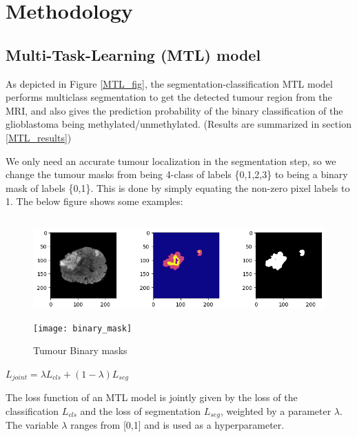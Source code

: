 \chapter{Methodology}
\ifpdf
    \graphicspath{{Chapter3/Chapter3Figs/PNG/}{Chapter3/Chapter3Figs/PDF/}{Chapter3/Chapter3Figs/}}
\else
    \graphicspath{{Chapter3/Chapter3Figs/EPS/}{Chapter3/Chapter3Figs/}}
\fi

\section{Multi-Task-Learning (MTL) model}\label{MTL}
\vspace*{3mm}
As depicted in Figure \ref{MTL_fig}, the segmentation-classification MTL model performs multiclass segmentation to get the detected tumour region from the MRI, and also gives the prediction probability of the binary classification of the glioblastoma being methylated/unmethylated. (Results are summarized in section \ref{MTL_results})
\vspace*{3mm}

We only need an accurate tumour localization in the segmentation step, so we change the tumour masks from being 4-class of labels \{0,1,2,3\} to being a binary mask of labels \{0,1\}. This is done by simply equating the non-zero pixel labels to 1. The below figure shows some examples:
\vspace*{4mm}
\begin{figure}[H]
  \begin{center}
    \leavevmode
    \ifpdf
      \includegraphics[height=1.5in]{Methodology/Chapter3Figs/binary_mask.png}
    \else
      \texttt{[image: binary\_mask]}
    \fi
    \caption{Tumour Binary masks}
    \label{binary_mask}
  \end{center}
\end{figure}

\begin{center}
    $L_{joint} =\displaystyle \lambda L_{cls} + (1-\lambda) L_{seg}$
\end{center}
The loss function of an MTL model is jointly given by the loss of the classification $L_{cls}$ and the loss of segmentation $L_{seg}$, weighted by a parameter $\lambda$. The variable $\lambda$ ranges from [0,1] and is used as a hyperparameter. 
\vspace*{3mm}

